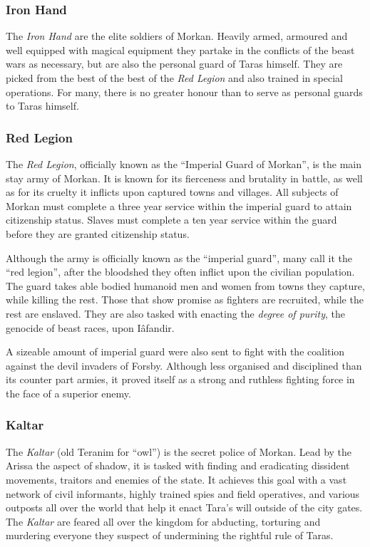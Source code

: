\subsubsection*{Iron Hand}

The \emph{Iron Hand} are the elite soldiers of Morkan. Heavily armed, armoured
and well equipped with magical equipment they partake in the conflicts of the
beast wars as necessary, but are also the personal guard of Taras himself. They
are picked from the best of the best of the \emph{Red Legion} and also trained
in special operations. For many, there is no greater honour than to serve as
personal guards to Taras himself.

\subsubsection*{Red Legion}

The \emph{Red Legion}, officially known as the ``Imperial Guard of Morkan'',
is the main stay army of Morkan. It is known for its fierceness and brutality
in battle, as well as for its cruelty it inflicts upon captured towns and
villages.  All subjects of Morkan must complete a three year service within
the imperial guard to attain citizenship status. Slaves must complete a ten
year service within the guard before they are granted citizenship status.

Although the army is officially known as the ``imperial guard'', many call it
the ``red legion'', after the bloodshed they often inflict upon the civilian
population. The guard takes able bodied humanoid men and women from towns they
capture, while killing the rest. Those that show promise as fighters are
recruited, while the rest are enslaved. They are also tasked with enacting the
\emph{degree of purity}, the genocide of beast races, upon Iâfandir.

A sizeable amount of imperial guard were also sent to fight with the coalition
against the devil invaders of Forsby. Although less organised and disciplined
than its counter part armies, it proved itself as a strong and ruthless
fighting force in the face of a superior enemy.

\subsubsection*{Kaltar}

The \emph{Kaltar} (old Teranim for ``owl'') is the secret police of
Morkan. Lead by the Arissa the aspect of shadow, it is tasked with finding and
eradicating dissident movements, traitors and enemies of the state.  It
achieves this goal with a vast network of civil informants, highly trained
spies and field operatives, and various outposts all over the world that help
it enact Tara's will outside of the city gates. The \emph{Kaltar} are feared
all over the kingdom for abducting, torturing and murdering everyone they
suspect of undermining the rightful rule of Taras.

